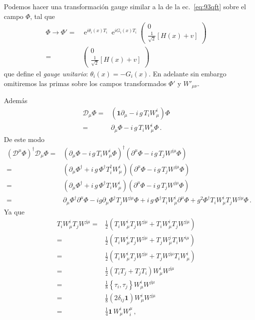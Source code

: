 \begin{frame}
Podemos hacer una transformación gauge similar a la de la 
ec.~\eqref{eq:93qft} sobre el campo $\Phi$, tal que
\begin{align}
  \label{eq:123qft}
    {\Phi}\to{\Phi}'=&\operatorname{e}^{i \theta_i(x) T_i}\operatorname{e}^{i G_i(x) T_i}
  \begin{pmatrix}
    0\\
    \frac{1}{\sqrt{2}}[H(x)+v]
  \end{pmatrix}\nonumber\\
  =&\begin{pmatrix}
    0\\
    \frac{1}{\sqrt{2}}[H(x)+v]
  \end{pmatrix}
\end{align}
que define el \emph{gauge unitario}: $\theta_i(x)=-G_i(x)$. En adelante sin embargo omitiremos las primas sobre los campos transformados ${\Phi}'$ y $W'_{\mu\nu}$.
\end{frame}
Además
\begin{align}
\mathcal{D}_{\mu} \Phi =& \left( \boldsymbol{1}\partial_{\mu}-i\,g\,T_i W^i_{\mu} \right)\Phi \nonumber\\
=&  \partial_{\mu}\Phi -i\,g\,T_i W^i_{\mu}\Phi \,.
\end{align}
De este modo
\begin{align}
  \left( \mathcal{D}^{\mu} \Phi \right)^{\dagger}  \mathcal{D}_{\mu} \Phi
=&\left(\partial_{\mu}\Phi -i\,g\,T_i W^i_{\mu}\Phi \right)^{\dagger}
\left( \partial^{\mu}\Phi -i\,g\,T_j W^{j\mu}\Phi \right) \nonumber\\
=&\left( \partial_{\mu}\Phi^{\dagger} +i\,g\,\Phi^{\dagger}T_i^{\dagger} W^i_{\mu} \right)
\left( \partial^{\mu}\Phi -i\,g\,T_j W^{j\mu}\Phi \right) \nonumber\\
=&\left(\partial_{\mu}\Phi^{\dagger} +i\,g\,\Phi^{\dagger}T_i W^i_{\mu} \right)
\left( \partial^{\mu}\Phi -i\,g\,T_j W^{j\mu}\Phi \right) \nonumber\\
 =& \partial_{\mu}\Phi^{\dagger} \partial^{\mu}\Phi -ig \partial_{\mu}\Phi^{\dagger} T_j W^{j\mu} \Phi
     +i\,g\,\Phi^{\dagger}T_i W^i_{\mu} \partial^{\mu}\Phi
   +g^2 \Phi^{\dagger} T_i W^i_{\mu}  T_j W^{j\mu} \Phi\,.
\end{align}
Ya que
\begin{align}
  T_i W^i_{\mu}  T_j W^{j\mu} = &\frac{1}{2}\left( T_i W^i_{\mu}  T_j W^{j\mu} +T_i W^i_{\mu}  T_j W^{j\mu}    \right)\nonumber\\
  = &\frac{1}{2}\left( T_i W^i_{\mu}  T_j W^{j\mu} +T_j W^j_{\mu}  T_i W^{i\mu}    \right)\nonumber\\
  = &\frac{1}{2}\left( T_i W^i_{\mu}  T_j W^{j\mu} +T_j W^{j\mu}  T_i W^{i}_{\mu}    \right)\nonumber\\
  = &\frac{1}{2}\left( T_i  T_j  +T_j T_i \right)W^i_{\mu}W^{j\mu}\nonumber\\
   = &\frac{1}{8} \left\{ \tau_i , \tau_j \right\} W^i_{\mu}W^{j\mu}\nonumber\\
  = &\frac{1}{8}\left( 2 \delta_{ij} \boldsymbol{1} \right)W^i_{\mu}W^{j\mu}\nonumber\\
  = &\frac{1}{4}\boldsymbol{1}\,W^i_{\mu}W^{\mu}_{i}\,,
\end{align}
